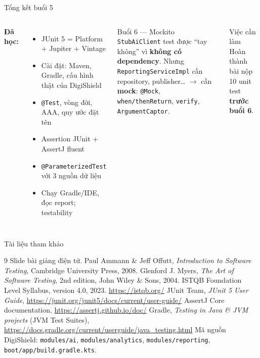 \documentclass[aspectratio=169,12pt]{beamer}
\begin{document}
\begin{frame}{Tổng kết buổi 5}
  \begin{columns}
    \textbf{Đã học:}
    \begin{itemize}
      \item JUnit 5 = Platform + Jupiter + Vintage
      \item Cài đặt: Maven, Gradle,
            cấu hình thật của DigiShield
      \item \texttt{@Test}, vòng đời, AAA, quy ước đặt tên
      \item Assertion JUnit + AssertJ fluent
      \item \texttt{@ParameterizedTest} với 3 nguồn dữ liệu
      \item Chạy Gradle/IDE, đọc report; testability
    \end{itemize}

    \begin{block}{Buổi 6 --- Mockito}
      \texttt{StubAiClient} test được ``tay không'' vì
      \textbf{không có dependency}. Nhưng
      \texttt{ReportingServiceImpl} cần repository, publisher\dots
      \(\to\) cần \textbf{mock}: \texttt{@Mock},
      \texttt{when/thenReturn}, \texttt{verify},
      \texttt{ArgumentCaptor}.
    \end{block}
    \begin{alertblock}{Việc cần làm}
      Hoàn thành bài nộp 10 unit test
      \textbf{trước buổi 6}.
    \end{alertblock}
  \end{columns}
\end{frame}

\begin{frame}{Tài liệu tham khảo}
  \vspace*{-0.4em}
  \footnotesize
  \begin{thebibliography}{9}
     Slide bài giảng điện tử.
     Paul Ammann \& Jeff Offutt, \textit{Introduction to Software
          Testing}, Cambridge University Press, 2008.
     Glenford J. Myers, \textit{The Art of Software Testing},
          2nd edition, John Wiley \& Sons, 2004.
     ISTQB Foundation Level Syllabus, version 4.0, 2023.
          \url{https://istqb.org/}
     JUnit Team, \textit{JUnit 5 User Guide},
          \url{https://junit.org/junit5/docs/current/user-guide/}
     AssertJ Core documentation,
          \url{https://assertj.github.io/doc/}
     Gradle, \textit{Testing in Java \& JVM projects} (JVM Test Suites),
          \url{https://docs.gradle.org/current/userguide/java_testing.html}
     Mã nguồn DigiShield: \texttt{modules/ai}, \texttt{modules/analytics},
          \texttt{modules/reporting}, \texttt{boot/app/build.gradle.kts}.
  \end{thebibliography}
\end{frame}

\end{document}
